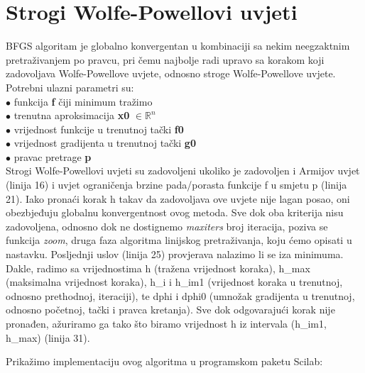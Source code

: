 \documentclass[bosnian,12pt,a4paper]{report}
\begin{document}
\section{Strogi Wolfe-Powellovi uvjeti}

\justify
BFGS algoritam je globalno konvergentan u kombinaciji sa nekim neegzaktnim pretraživanjem po pravcu, pri čemu najbolje radi upravo sa korakom koji zadovoljava Wolfe-Powellove uvjete, odnosno stroge Wolfe-Powellove uvjete. \\

Potrebni ulazni parametri su:\\
\hspace*{1cm}$\bullet$ funkcija \textbf{f} čiji minimum tražimo\\
\hspace*{1cm}$\bullet$ trenutna aproksimacija \textbf{x0} $ \in \mathbb{R}^n$\\
\hspace*{1cm}$\bullet$ vrijednost funkcije u trenutnoj tački \textbf{f0} \\
\hspace*{1cm}$\bullet$ vrijednost gradijenta u trenutnoj tački \textbf{g0} \\
\hspace*{1cm}$\bullet$ pravac pretrage \textbf{p} \\
\justify
Strogi Wolfe-Powellovi uvjeti su zadovoljeni ukoliko je zadovoljen i Armijov uvjet (linija 16) i uvjet ograničenja brzine pada/porasta funkcije f u smjetu p (linija 21). Iako pronaći korak h takav da zadovoljava ove uvjete nije lagan posao, oni obezbjeđuju globalnu konvergentnost ovog metoda. Sve dok oba kriterija nisu zadovoljena, odnosno dok ne dostignemo \textit{maxiters} broj iteracija, poziva se funkcija \textit{zoom}, druga faza algoritma linijskog pretraživanja, koju ćemo opisati u nastavku. Posljednji uslov (linija 25) provjerava nalazimo li se iza minimuma.
\justify
Dakle, radimo sa vrijednostima h (tražena vrijednost koraka), h_max (maksimalna vrijednost koraka), h_i i h_im1 (vrijednost koraka u trenutnoj, odnosno prethodnoj, iteraciji), te dphi i dphi0 (umnožak gradijenta u trenutnoj, odnosno početnoj, tački i pravca kretanja). Sve dok odgovarajući korak nije pronađen, ažuriramo ga tako što biramo vrijednost h iz intervala (h_im1, h_max) (linija 31).

\newpage
Prikažimo implementaciju ovog algoritma u programskom paketu Scilab:\\


\vspace*{0.5cm}
\end{document}
